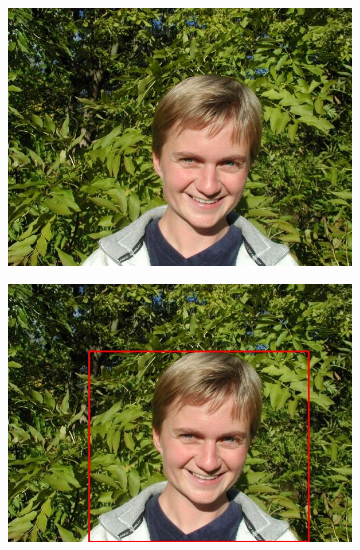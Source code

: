 \documentclass[a4paper,11]{article}
\begin{document}
\begin{center}
\begin{figure}[H]
\begin{subfigure}{0.33\textwidth}
    \end{subfigure}\\
      \vspace{1em}
      
    \begin{subfigure}{0.33\textwidth}
      \centering
      \includegraphics[width=0.9\linewidth]{images/person2}
    \end{subfigure}
    \begin{subfigure}{.33\textwidth}
      \centering
      \includegraphics[width=0.9\linewidth]{results/input/person2}
    \end{subfigure}
    \begin{subfigure}{0.33\textwidth}
      \centering

\end{subfigure}
\end{figure}
\end{center}
\end{document}

